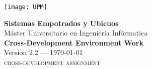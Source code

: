 \begin{titlepage}


\texttt{[image: UPM]}


\vfill\vspace{50pt}

\begin{center}
\textbf{\huge Sistemas Empotrados y Ubicuos}\\[\baselineskip]
{\large Máster Universitario en Ingeniería Infórmatica}\\[\baselineskip]
\textbf{\Huge Cross-Development Environment Work}\\[\baselineskip]
{\large Version 2.2 --- \today}\\[\baselineskip]
{\large\textsc{cross-development assignment}}
\end{center}

\vfill


\end{titlepage}
